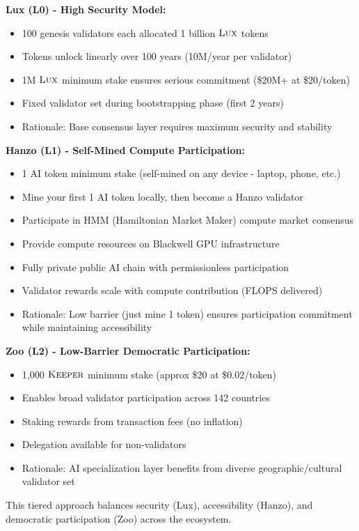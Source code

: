 \documentclass[11pt,letterpaper]{article}
\theoremstyle{definition}
\theoremstyle{remark}
\newcommand{\KEEPER}{\textsc{Keeper}}
\newcommand{\Lux}{\textsc{Lux}}
\begin{document}
\textbf{Lux (L0) - High Security Model:}
\begin{itemize}
\item 100 genesis validators each allocated 1 billion $\Lux$ tokens
\item Tokens unlock linearly over 100 years (10M/year per validator)
\item 1M $\Lux$ minimum stake ensures serious commitment (\$20M+ at \$20/token)
\item Fixed validator set during bootstrapping phase (first 2 years)
\item Rationale: Base consensus layer requires maximum security and stability
\end{itemize}

\textbf{Hanzo (L1) - Self-Mined Compute Participation:}
\begin{itemize}
\item 1 AI token minimum stake (self-mined on any device - laptop, phone, etc.)
\item Mine your first 1 AI token locally, then become a Hanzo validator
\item Participate in HMM (Hamiltonian Market Maker) compute market consensus
\item Provide compute resources on Blackwell GPU infrastructure
\item Fully private public AI chain with permissionless participation
\item Validator rewards scale with compute contribution (FLOPS delivered)
\item Rationale: Low barrier (just mine 1 token) ensures participation commitment while maintaining accessibility
\end{itemize}

\textbf{Zoo (L2) - Low-Barrier Democratic Participation:}
\begin{itemize}
\item 1,000 $\KEEPER$ minimum stake (approx \$20 at \$0.02/token)
\item Enables broad validator participation across 142 countries
\item Staking rewards from transaction fees (no inflation)
\item Delegation available for non-validators
\item Rationale: AI specialization layer benefits from diverse geographic/cultural validator set
\end{itemize}

This tiered approach balances security (Lux), accessibility (Hanzo), and democratic participation (Zoo) across the ecosystem.
\end{document}
